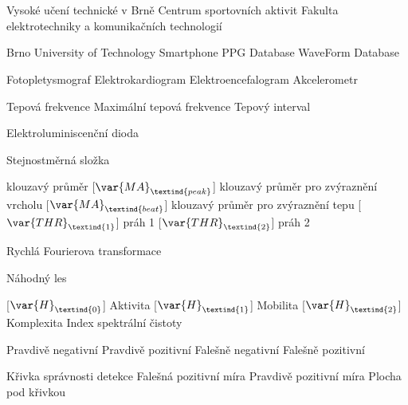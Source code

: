 \cleardoublepage
\chapter*{\listofabbrevname}
{}

\begin{acronym}[KolikMista]	%

			{Vysoké učení technické v Brně}
			{Centrum sportovních aktivit}
			{Fakulta elektrotechniky a komunikačních technologií}

		{Brno University of Technology Smartphone PPG Database}
			{WaveForm Database}

			{Fotopletysmograf}
			{Elektrokardiogram}
			{Elektroencefalogram}
			{Akcelerometr}

			{Tepová frekvence}
			{Maximální tepová frekvence}
			{Tepový interval}

			{Elektroluminiscenční dioda}

			{Stejnostměrná složka}

			{klouzavý průměr}
		[\ensuremath{\var{MA}_\textind{peak}}]
			{klouzavý průměr pro zvýraznění vrcholu}
		[\ensuremath{\var{MA}_\textind{beat}}]
		{klouzavý průměr pro zvýraznění tepu}
		[\ensuremath{\var{THR}_\textind{1}}]
		{práh 1}
		[\ensuremath{\var{THR}_\textind{2}}]
		{práh 2}
	
			{Rychlá Fourierova transformace}


			{Náhodný les}

		[\ensuremath{\var{H}_\textind{0}}]
		{Aktivita}
		[\ensuremath{\var{H}_\textind{1}}]
		{Mobilita}
		[\ensuremath{\var{H}_\textind{2}}]
		{Komplexita}
			{Index spektrální čistoty}

			{Pravdivě negativní}
			{Pravdivě pozitivní}
			{Falešně negativní}
			{Falešně pozitivní}

			{Křivka správnosti detekce}
			{Falešná pozitivní míra}
			{Pravdivě pozitivní míra}
			{Plocha pod křivkou}


\end{acronym}
